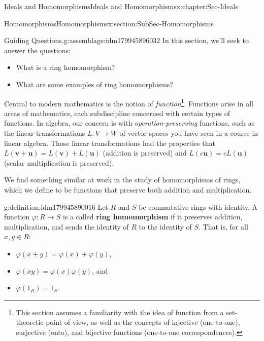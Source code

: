 \documentclass[oneside,10pt,]{book}
\newcommand{\terminology}[1]{\textbf{#1}}
\numberwithin{equation}{section}
\def\p{\varphi}
\begin{document}
\begin{chapterptx}{Ideals and Homomorphisms}{}{Ideals and Homomorphisms}{}{}{x:chapter:Sec-Ideals}
\typeout{************************************************}
%
\begin{sectionptx}{Homomorphisms}{}{Homomorphisms}{}{}{x:section:SubSec-Homomorphisms}
\begin{assemblage}{Guiding Questions.}{g:assemblage:idm179945896032}%
In this section, we'll seek to answer the questions: %
\begin{itemize}[label=\textbullet]
\item{}What is a ring homomorphism?%
\item{}What are some examples of ring homomorphisms?%
\end{itemize}
%
\end{assemblage}
\begin{introduction}{}%
Central to modern mathematics is the notion of \emph{function}\footnote{This section assumes a familiarity with the idea of function from a set-theoretic point of view, as well as the concepts of injective (one-to-one), surjective (onto), and bijective functions (one-to-one correspondences).\label{g:fn:idm179945893104}}. Functions arise in all areas of mathematics, each subdiscipline concerned with certain types of functions. In algebra, our concern is with \emph{operation-preserving} functions, such as the linear transformations \(L : V\to W\) of vector spaces you have seen in a course in linear algebra. Those linear transformations had the properties that \(L(\mathbf{v}+\mathbf{u}) = L(\mathbf{v})+L(\mathbf{u})\) (addition is preserved) and \(L(c\mathbf{u}) = c L(\mathbf{u})\) (scalar multiplication is preserved).%
\par
We find something similar at work in the study of homomorphisms of rings, which we define to be functions that preserve both addition and multiplication.%
\end{introduction}%
\begin{definition}{}{g:definition:idm179945890016}%
Let \(R\) and \(S\) be commutative rings with identity. A function \(\p : R\to S\) is a called \terminology{ring homomorphism} if it preserves addition, multiplication, and sends the identity of \(R\) to the identity of \(S\). That is, for all \(x,y\in R\):%
\begin{itemize}[label=\textbullet]
\item{}\(\p(x+y) = \p(x) + \p(y)\),%
\item{}\(\p(xy) = \p(x)\p(y)\), and%
\item{}\(\p(1_R) = 1_S\).%
\end{itemize}

\end{definition}
\end{sectionptx}
\end{chapterptx}
\end{document}
